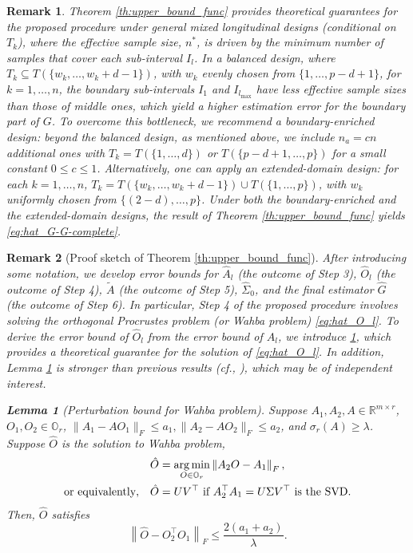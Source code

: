 \documentclass[11pt]{article}
\newtheorem{Lemma}{Lemma}
\newtheorem{Remark}{Remark}
\newcommand{\0}{{\mathbf{0}}}
\newcommand{\1}{{\mathbf{1}}}
\newcommand{\argmin}{\mathop{\rm arg\min}}
\begin{document}
\begin{Remark}\rm 
	Theorem \ref{th:upper_bound_func} provides theoretical guarantees for the proposed procedure under general mixed longitudinal designs (conditional on $T_k$), where the effective sample size, $n^\ast$, is driven by the minimum number of samples that cover each sub-interval $I_l$. In a balanced design, where $T_k \subseteq T(\{w_k, \dots, w_k+d-1\})$, with $w_k$ evenly chosen from $\{1, \ldots, p-d+1\}$, for $k=1,\ldots, n$, the boundary sub-intervals $I_1$ and $I_{l_{\max}}$ have less effective sample sizes than those of middle ones, which yield a higher estimation error for the boundary part of $G$. To overcome this bottleneck, we recommend a boundary-enriched design: beyond the balanced design, as mentioned above, we include $n_a = cn$ additional ones with $T_k=T(\{1,\dots, d\})$ or $T(\{p-d+1,\dots,p\})$ for a small constant $0 \le c \le 1$. 
	Alternatively, one can apply an extended-domain design: for each $k=1,\dots, n$, $T_k = T(\{w_k,\dots, w_k+d-1\}) \cup T(\{1,\dots, p\})$, with $w_k$ uniformly chosen from $\{(2-d), \ldots, p\}$. Under both the boundary-enriched and the extended-domain designs, the result of Theorem \ref{th:upper_bound_func} yields \eqref{eq:hat_G-G-complete}.
\end{Remark}

\begin{Remark}[Proof sketch of Theorem \ref{th:upper_bound_func}]\rm 
	After introducing some notation, we develop error bounds for $\hat{A}_l$ (the outcome of Step 3), $\hat{O}_l$ (the outcome of Step 4), $\tilde{A}$ (the outcome of Step 5), $\hat{\Sigma}_0$, and the final estimator $\hat{G}$ (the outcome of Step 6). In particular, Step 4 of the proposed procedure involves solving the orthogonal Procrustes problem (or Wahba problem) \eqref{eq:hat_O_l}. To derive the error bound of $\hat{O}_l$ from the error bound of $\hat{A}_l$, we introduce  \ref{lm:rotations-Wahba}, which provides a theoretical guarantee for the solution of \eqref{eq:hat_O_l}. In addition, Lemma \ref{lm:rotations-Wahba} is stronger than previous results (cf., \cite[Lemma 16]{bishop2014deterministic}), which may be of independent interest. 
	\begin{Lemma}[Perturbation bound for Wahba problem]\label{lm:rotations-Wahba}
		Suppose $A_1, A_2, A\in \mathbb{R}^{m \times r}$, $O_1, O_2 \in \mathbb{O}_{r}$, $\|A_1 - AO_1\|_F \leq a_1, \|A_2 - AO_2\|_F\leq a_2$, and $\sigma_r(A)\geq \lambda$. Suppose $\hat{O}$ is the solution to Wahba problem,
		\begin{equation*}
		\begin{split}
		& \quad \hat{O} = \argmin_{O\in \mathbb{O}_r}\left\|A_2 O - A_1\right\|_F,\\ \text{or equivalently}, &  \quad \hat{O} = UV^\top \text{ if } A_2^\top A_1 = U\Sigma V^\top \text{ is the SVD}.
		\end{split}
		\end{equation*}
		Then, $\hat{O}$ satisfies
		\begin{equation}
		\left\|\hat{O} - O_2^\top O_1 \right\|_F \leq \frac{2(a_1+a_2)}{\lambda}. 
		\end{equation}
	\end{Lemma}
\end{Remark}
\end{document}
